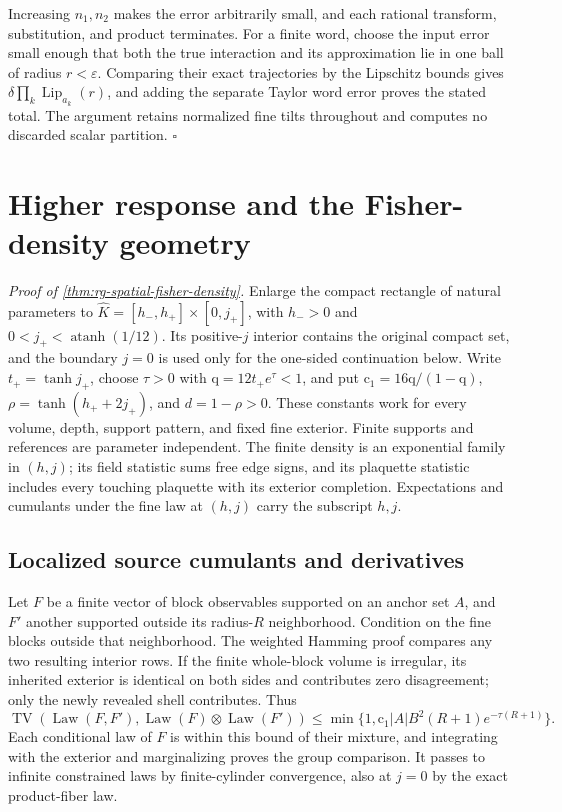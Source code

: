Increasing \(n_1,n_2\) makes the error arbitrarily small, and each rational
transform, substitution, and product terminates. For a finite word, choose
the input error small enough that both the true interaction and its
approximation lie in one ball of radius \(r<\varepsilon\). Comparing their
exact trajectories by the Lipschitz bounds gives
\(\delta\prod_k\operatorname{Lip}_{a_k}(r)\), and adding the separate Taylor
word error proves the stated total. The argument retains normalized fine
tilts throughout and computes no discarded scalar partition.
\hfill\(\square\)

\section{Higher response and the Fisher-density geometry}
\label{sec:rg-spatial-proof-fisher}

\noindent\emph{Proof of \cref{thm:rg-spatial-fisher-density}.}
Enlarge the compact rectangle of natural parameters to
\(\widehat K=[h_-,h_+]\times[0,j_+]\), with \(h_->0\) and
\(0<j_+<\operatorname{atanh}(1/12)\). Its positive-\(j\) interior contains
the original compact set, and the boundary \(j=0\) is used only for the
one-sided continuation below. Write \(t_+=\tanh j_+\), choose \(\tau>0\)
with \(\mathrm q=12t_+e^\tau<1\), and put \(\mathrm c_1=16\mathrm q/(1-\mathrm q)\),
\(\rho=\tanh(h_++2j_+)\), and \(d=1-\rho>0\). These constants work for
every volume, depth, support pattern, and fixed fine exterior. Finite
supports and references are parameter independent. The finite density is
an exponential family in \((h,j)\); its field statistic sums free edge
signs, and its plaquette statistic includes every touching plaquette with
its exterior completion. Expectations and cumulants under the fine law at
\((h,j)\) carry the subscript \(h,j\).

\subsection{Localized source cumulants and derivatives}
\label{sec:rg-spatial-proof-higher-response}

Let \(F\) be a finite vector of block observables supported on an anchor
set \(A\), and \(F'\) another supported outside its radius-\(R\)
neighborhood. Condition on the fine blocks outside that neighborhood. The
weighted Hamming proof compares any two resulting interior rows. If the
finite whole-block volume is irregular, its inherited exterior is identical
on both sides and contributes zero disagreement; only the newly revealed
shell contributes. Thus
\begin{equation}
 \operatorname{TV}(\operatorname{Law}(F,F'),
       \operatorname{Law}(F)\otimes\operatorname{Law}(F'))
 \le\min\{1,\mathrm c_1|A|B^2(R+1)e^{-\tau(R+1)}\}.
 \label{eq:rg-spatial-proof-group-decoupling}
\end{equation}
Each conditional law of \(F\) is within this bound of their mixture, and
integrating with the exterior and marginalizing proves the group
comparison. It passes to infinite constrained laws by finite-cylinder
convergence, also at \(j=0\) by the exact product-fiber law.

